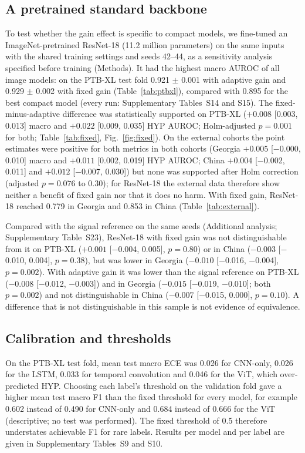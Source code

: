\documentclass{wlscirep}
\begin{document}
\subsection*{A pretrained standard backbone}
To test whether the gain effect is specific to compact models, we fine-tuned an ImageNet-pretrained ResNet-18 \cite{he2016resnet} (11.2 million parameters) on the same inputs with the shared training settings and seeds 42--44, as a sensitivity analysis specified before training (Methods). It had the highest macro AUROC of all image models: on the PTB-XL test fold 0.921 $\pm$ 0.001 with adaptive gain and 0.929 $\pm$ 0.002 with fixed gain (Table~\ref{tab:ptbxl}), compared with 0.895 for the best compact model (every run: Supplementary Tables~S14 and S15). The fixed-minus-adaptive difference was statistically supported on PTB-XL ($+0.008$ [0.003, 0.013] macro and $+0.022$ [0.009, 0.035] HYP AUROC; Holm-adjusted $p=0.001$ for both; Table~\ref{tab:fixed}, Fig.~\ref{fig:fixed}). On the external cohorts the point estimates were positive for both metrics in both cohorts (Georgia $+0.005$ [$-$0.000, 0.010] macro and $+0.011$ [0.002, 0.019] HYP AUROC; China $+0.004$ [$-$0.002, 0.011] and $+0.012$ [$-$0.007, 0.030]) but none was supported after Holm correction (adjusted $p=0.076$ to $0.30$); for ResNet-18 the external data therefore show neither a benefit of fixed gain nor that it does no harm. With fixed gain, ResNet-18 reached 0.779 in Georgia and 0.853 in China (Table~\ref{tab:external}).

Compared with the signal reference on the same seeds (Additional analysis; Supplementary Table~S23), ResNet-18 with fixed gain was not distinguishable from it on PTB-XL ($+0.001$ [$-$0.004, 0.005], $p=0.80$) or in China ($-0.003$ [$-$0.010, 0.004], $p=0.38$), but was lower in Georgia ($-0.010$ [$-$0.016, $-$0.004], $p=0.002$). With adaptive gain it was lower than the signal reference on PTB-XL ($-0.008$ [$-$0.012, $-$0.003]) and in Georgia ($-0.015$ [$-$0.019, $-$0.010]; both $p=0.002$) and not distinguishable in China ($-0.007$ [$-$0.015, 0.000], $p=0.10$). A difference that is not distinguishable in this sample is not evidence of equivalence.

\subsection*{Calibration and thresholds}
On the PTB-XL test fold, mean test macro ECE was 0.026 for CNN-only, 0.026 for the LSTM, 0.033 for temporal convolution and 0.046 for the ViT, which over-predicted HYP. Choosing each label's threshold on the validation fold gave a higher mean test macro F1 than the fixed threshold for every model, for example 0.602 instead of 0.490 for CNN-only and 0.684 instead of 0.666 for the ViT (descriptive; no test was performed). The fixed threshold of 0.5 therefore understates achievable F1 for rare labels. Results per model and per label are given in Supplementary Tables~S9 and S10.
\end{document}
